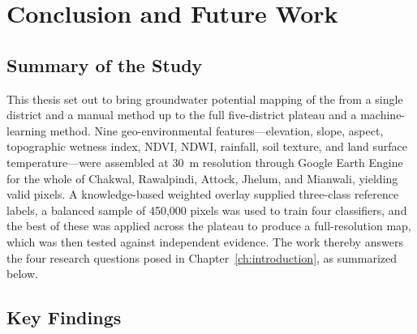 \chapter{Conclusion and Future Work}
\label{ch:conclusion}

\section{Summary of the Study}
\label{sec:concl_summary}

This thesis set out to bring groundwater potential mapping of the \studyarea{}
from a single district and a manual method up to the full five-district plateau
and a machine-learning method. Nine geo-environmental features---elevation,
slope, aspect, topographic wetness index, NDVI, NDWI, rainfall, soil texture, and
land surface temperature---were assembled at 30~m resolution through Google Earth
Engine for the whole of Chakwal, Rawalpindi, Attock, Jhelum, and Mianwali,
yielding \npixels{} valid pixels. A knowledge-based weighted overlay supplied
three-class reference labels, a balanced sample of 450,000 pixels was used to
train four classifiers, and the best of these was applied across the plateau to
produce a full-resolution map, which was then tested against independent evidence.
The work thereby answers the four research questions posed in
Chapter~\ref{ch:introduction}, as summarized below.

\section{Key Findings}
\label{sec:concl_findings}

